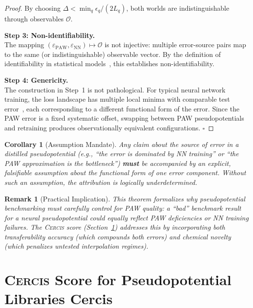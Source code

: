 \documentclass[11pt,a4paper]{article}
\newtheorem{corollary}[theorem]{Corollary}
\newtheorem{remark}[theorem]{Remark}
\theoremstyle{definition}
\newcommand{\Cercis}{\textsc{Cercis}}
\begin{document}
\begin{proof}
By choosing $\Delta < \min_q \epsilon_q / (2L_q)$, both worlds are indistinguishable through observables $\mathcal{O}$.

\textbf{Step 3: Non-identifiability.}\\
The mapping $(\varepsilon_{\mathrm{PAW}}, \varepsilon_{\mathrm{NN}}) \mapsto \mathcal{O}$ is not injective: multiple error-source pairs map to the same (or indistinguishable) observable vector. By the definition of identifiability in statistical models~\cite{Lehmann1998}, this establishes non-identifiability.

\textbf{Step 4: Genericity.}\\
The construction in Step~1 is not pathological. For typical neural network training, the loss landscape has multiple local minima with comparable test error~\cite{Choromanska2015}, each corresponding to a different functional form of the error. Since the PAW error is a fixed systematic offset, swapping between PAW pseudopotentials and retraining produces observationally equivalent configurations. $\square$
\end{proof}

\begin{corollary}[Assumption Mandate]\label{cor:assumption_mandate}
Any claim about the source of error in a distilled pseudopotential (e.g., ``the error is dominated by NN training'' or ``the PAW approximation is the bottleneck'') \textbf{must} be accompanied by an explicit, falsifiable assumption about the functional form of one error component. Without such an assumption, the attribution is logically underdetermined.
\end{corollary}

\begin{remark}[Practical Implication]\label{rem:practical_implication}
This theorem formalizes why pseudopotential benchmarking must carefully control for PAW quality: a ``bad'' benchmark result for a neural pseudopotential could equally reflect PAW deficiencies or NN training failures. The \Cercis{} score (Section~\ref{sec:cercis}) addresses this by incorporating both \textit{transferability accuracy} (which compounds both errors) and \textit{chemical novelty} (which penalizes untested interpolation regimes).
\end{remark}

\section{\Cercis{} Score for Pseudopotential Libraries Cercis}
\label{sec:cercis}
\end{document}
